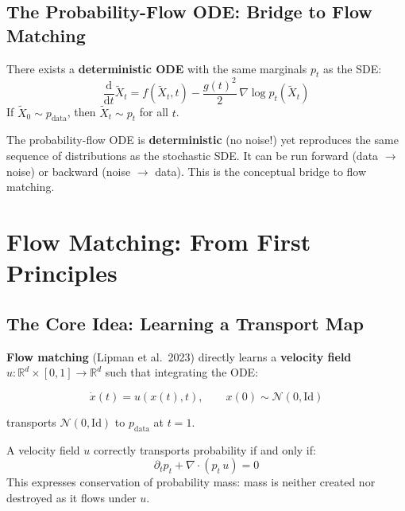 \documentclass[11pt, a4paper]{article}
\newcommand{\Rd}{\mathbb{R}}
\newcommand{\Id}{\mathrm{Id}}
\newcommand{\pdata}{p_{\mathrm{data}}}
\newcommand{\dd}{\mathrm{d}}
\newcommand{\ddt}{\frac{\dd}{\dd t}}
\newcommand{\grad}{\nabla}
\newcommand{\divg}{\nabla \cdot}
\theoremstyle{plain}
\theoremstyle{definition}
\theoremstyle{remark}
\begin{document}
\subsection{The Probability-Flow ODE: Bridge to Flow Matching}

\begin{thmbox}
There exists a \textbf{deterministic ODE} with the same marginals $p_t$ as the SDE:
\begin{equation}
  \ddt \tilde{X}_t = f(\tilde{X}_t, t) - \frac{g(t)^2}{2}\,\grad \log p_t(\tilde{X}_t)
  \label{eq:pf_ode}
\end{equation}
If $\tilde{X}_0 \sim \pdata$, then $\tilde{X}_t \sim p_t$ for all $t$.
\end{thmbox}

\begin{intubox}
The probability-flow ODE is \textbf{deterministic} (no noise!) yet reproduces the same sequence of distributions as the stochastic SDE. It can be run forward (data $\to$ noise) or backward (noise $\to$ data). This is the conceptual bridge to flow matching.
\end{intubox}

\section{Flow Matching: From First Principles}
\label{sec:flow_matching}

\subsection{The Core Idea: Learning a Transport Map}

\textbf{Flow matching} (Lipman et al.\ 2023) directly learns a \textbf{velocity field} $u : \Rd^d \times [0,1] \to \Rd^d$ such that integrating the ODE:

\begin{equation}
  \dot{x}(t) = u(x(t), t), \qquad x(0) \sim \mathcal{N}(0, \Id)
  \label{eq:ode}
\end{equation}

transports $\mathcal{N}(0,\Id)$ to $\pdata$ at $t=1$.

\begin{defbox}
A velocity field $u$ correctly transports probability if and only if:
\[
  \partial_t p_t + \divg(p_t\, u) = 0
\]
This expresses conservation of probability mass: mass is neither created nor destroyed as it flows under $u$.
\end{defbox}
\end{document}
